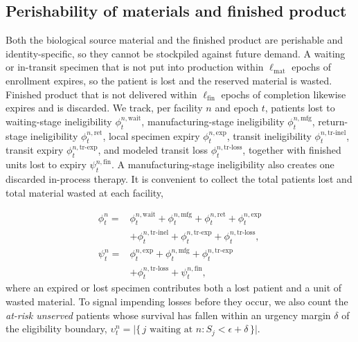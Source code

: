 \documentclass[preprint,review,12pt]{elsarticle}
\begin{document}
\subsection{Perishability of materials and finished product}
\label{sec:problem-expiry}

Both the biological source material and the finished product are perishable and identity-specific, so they cannot be stockpiled against future demand. A waiting or in-transit specimen that is not put into production within $\ell_{\mathrm{mat}}$ epochs of enrollment expires, so the patient is lost and the reserved material is wasted. Finished product that is not delivered within $\ell_{\mathrm{fin}}$ epochs of completion likewise expires and is discarded. We track, per facility $n$ and epoch $t$, patients lost to waiting-stage ineligibility $\phi^{n,\mathrm{wait}}_t$, manufacturing-stage ineligibility $\phi^{n,\mathrm{mfg}}_t$, return-stage ineligibility $\phi^{n,\mathrm{ret}}_t$, local specimen expiry $\phi^{n,\mathrm{exp}}_t$, transit ineligibility $\phi^{n,\mathrm{tr\text{-}inel}}_t$, transit expiry $\phi^{n,\mathrm{tr\text{-}exp}}_t$, and modeled transit loss $\phi^{n,\mathrm{tr\text{-}loss}}_t$, together with finished units lost to expiry $\psi^{n,\mathrm{fin}}_t$. A manufacturing-stage ineligibility also creates one discarded in-process therapy. It is convenient to collect the total patients lost and total material wasted at each facility,

\begin{equation}
\label{eq:loss-aggregates}
\begin{aligned}
\phi^{n}_t ={}& \phi^{n,\mathrm{wait}}_t + \phi^{n,\mathrm{mfg}}_t
  + \phi^{n,\mathrm{ret}}_t + \phi^{n,\mathrm{exp}}_t \\
&+ \phi^{n,\mathrm{tr\text{-}inel}}_t + \phi^{n,\mathrm{tr\text{-}exp}}_t
  + \phi^{n,\mathrm{tr\text{-}loss}}_t, \\
\psi^{n}_t ={}& \phi^{n,\mathrm{exp}}_t + \phi^{n,\mathrm{mfg}}_t
  + \phi^{n,\mathrm{tr\text{-}exp}}_t \\
&+ \phi^{n,\mathrm{tr\text{-}loss}}_t + \psi^{n,\mathrm{fin}}_t,
\end{aligned}
\end{equation}
where an expired or lost specimen contributes both a lost patient and a unit of wasted material. To signal impending losses before they occur, we also count the \emph{at-risk unserved} patients whose survival has fallen within an urgency margin $\delta$ of the eligibility boundary, $\upsilon^{n}_t = \big|\{\, j \text{ waiting at } n : S_j < \epsilon + \delta \,\}\big|$.
\end{document}
